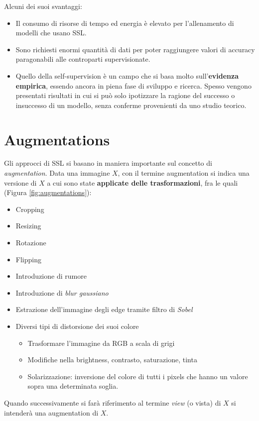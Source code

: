 Alcuni dei suoi svantaggi:
\begin{itemize}
    \item Il consumo di risorse di tempo ed energia è elevato per l'allenamento di modelli che usano SSL.
    \item Sono richiesti enormi quantità di dati per poter raggiungere valori di accuracy paragonabili alle controparti supervisionate.
    \item Quello della self-supervision è un campo che si basa molto sull'\textbf{evidenza empirica}, essendo ancora in piena fase di sviluppo e ricerca. Spesso vengono presentati risultati in cui si può solo ipotizzare la ragione del successo o insuccesso di un modello, senza conferme provenienti da uno studio teorico.
\end{itemize}

\section{Augmentations}
\label{augmentations}
Gli approcci di SSL si basano in maniera importante sul concetto di \textit{augmentation}. Data una immagine \(X\), con il termine augmentation si indica una versione di \(X\) a cui sono state \textbf{applicate delle trasformazioni}, fra le quali (Figura \ref{fig:augmentations}):
\begin{itemize}
    \item Cropping
    \item Resizing
    \item Rotazione
    \item Flipping
    \item Introduzione di rumore
    \item Introduzione di \textit{blur gaussiano}
    \item Estrazione dell'immagine degli edge tramite filtro di \textit{Sobel}
    \item Diversi tipi di distorsione dei suoi colore
    \begin{itemize}
        \item Trasformare l'immagine da RGB a scala di grigi
        \item Modifiche nella brightness, contrasto, saturazione, tinta
        \item Solarizzazione: inversione del colore di tutti i pixels che hanno un valore sopra una determinata soglia.
    \end{itemize}
\end{itemize}
Quando successivamente si farà riferimento al termine \textit{view} (o vista) di \(X\) si intenderà una augmentation di \(X\).

